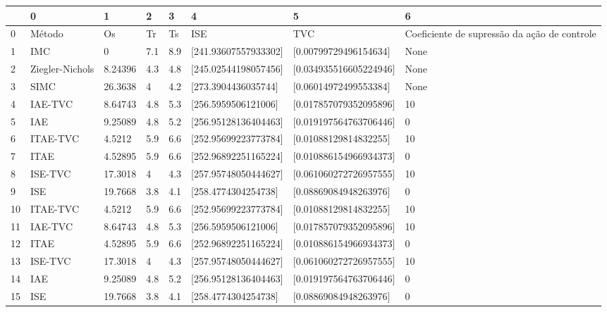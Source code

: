 \begin{tabular}{llllllll}
\toprule
{} &                0 &        1 &    2 &    3 &                     4 &                       5 &                                             6 \\
\midrule
0  &           Método &       Os &   Tr &   Ts &                   ISE &                     TVC &  Coeficiente de supressão da ação de controle \\
1  &              IMC &        0 &  7.1 &  8.9 &  [241.93607557933302] &   [0.00799729496154634] &                                          None \\
2  &  Ziegler-Nichols &  8.24396 &  4.3 &  4.8 &  [245.02544198057456] &  [0.034935516605224946] &                                          None \\
3  &             SIMC &  26.3638 &    4 &  4.2 &   [273.3904436035744] &   [0.06014972499553384] &                                          None \\
4  &          IAE-TVC &  8.64743 &  4.8 &  5.3 &   [256.5959506121006] &  [0.017857079352095896] &                                            10 \\
5  &              IAE &  9.25089 &  4.8 &  5.2 &  [256.95128136404463] &  [0.019197564763706446] &                                             0 \\
6  &         ITAE-TVC &   4.5212 &  5.9 &  6.6 &  [252.95699223773784] &   [0.01088129814832255] &                                            10 \\
7  &             ITAE &  4.52895 &  5.9 &  6.6 &  [252.96892251165224] &  [0.010886154966934373] &                                             0 \\
8  &          ISE-TVC &  17.3018 &    4 &  4.3 &  [257.95748050444627] &  [0.061060272726957555] &                                            10 \\
9  &              ISE &  19.7668 &  3.8 &  4.1 &   [258.4774304254738] &   [0.08869084948263976] &                                             0 \\
10 &         ITAE-TVC &   4.5212 &  5.9 &  6.6 &  [252.95699223773784] &   [0.01088129814832255] &                                            10 \\
11 &          IAE-TVC &  8.64743 &  4.8 &  5.3 &   [256.5959506121006] &  [0.017857079352095896] &                                            10 \\
12 &             ITAE &  4.52895 &  5.9 &  6.6 &  [252.96892251165224] &  [0.010886154966934373] &                                             0 \\
13 &          ISE-TVC &  17.3018 &    4 &  4.3 &  [257.95748050444627] &  [0.061060272726957555] &                                            10 \\
14 &              IAE &  9.25089 &  4.8 &  5.2 &  [256.95128136404463] &  [0.019197564763706446] &                                             0 \\
15 &              ISE &  19.7668 &  3.8 &  4.1 &   [258.4774304254738] &   [0.08869084948263976] &                                             0 \\
\bottomrule
\end{tabular}
